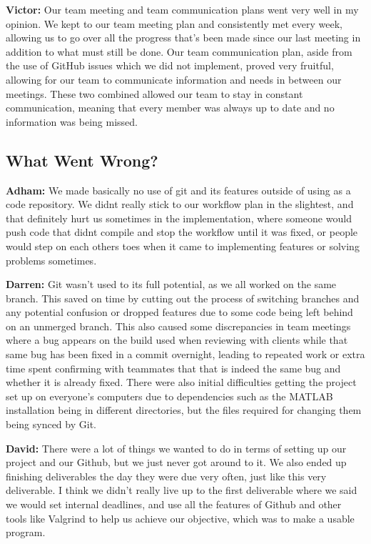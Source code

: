 \documentclass{article}
\begin{document}
\textbf{Victor:} Our team meeting and team communication plans went very well in my opinion. We kept to our team meeting plan and consistently met every week, 
allowing us to go over all the progress that's been made since our last meeting in addition to what must still be done. Our team communication plan, aside from the use of 
GitHub issues which we did not implement, proved very fruitful, allowing for our team to communicate information and needs in between our meetings. These two combined allowed 
our team to stay in constant communication, meaning that every member was always up to date and no information was being missed.

\subsection{What Went Wrong?}

\textbf{Adham:} We made basically no use of git and its features outside of using as a code repository. We didnt really stick to our workflow plan in the slightest, and that
definitely hurt us sometimes in the implementation, where someone would push code that didnt compile and stop the workflow until it was fixed, or people would step on each others
toes when it came to implementing features or solving problems sometimes.

\textbf{Darren:} Git wasn't used to its full potential, as we all worked on the same branch. This saved on time by cutting out the process of switching branches and any potential confusion or dropped features due to some code being left behind on an unmerged branch. This also caused some discrepancies in team meetings where a bug appears on the build used when reviewing with clients while that same bug has been fixed in a commit overnight, leading to repeated work or extra time spent confirming with teammates that that is indeed the same bug and whether it is already fixed. There were also initial difficulties getting the project set up on everyone's computers due to dependencies such as the MATLAB installation being in different directories, but the files required for changing them being synced by Git.

\textbf{David:} There were a lot of things we wanted to do in terms of setting up our project and our Github, but we 
just never got around to it. We also ended up finishing deliverables the day they were due very often, just like this 
very deliverable. I think we didn't really live up to the first deliverable where we said we would set internal 
deadlines, and use all the features of Github and other tools like Valgrind to help us achieve our objective, which was 
to make a usable program. 
\end{document}
